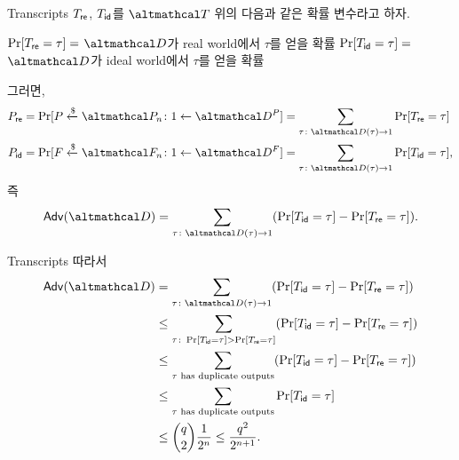 \documentclass[../250428_msquare_provable_security.tex]{subfiles}
\begin{document}
\begin{frame}{Transcripts}
    \(T_{\mathsf{re}}\), \(T_{\mathsf{id}}\)를 \(\mcal{T}\) 위의 다음과 같은 확률 변수라고 하자.
    \begin{itemize}
        \ii
        \(\Pr[T_{\mathsf{re}} = \tau] = \mbox{}\)\(\mcal{D}\)가 real world에서 \(\tau\)를 얻을 확률
        \ii
        \(\Pr[T_{\mathsf{id}} = \tau] = \mbox{}\)\(\mcal{D}\)가 ideal world에서 \(\tau\)를 얻을 확률
    \end{itemize}

    \pause
    그러면,
    \begin{align*}
        P_{\msf{re}} &= \Pr[P \dgets \mcal{P}_n \colon 1 \gets \mcal{D}^{P}]
        = \sum_{\tau \colon \mcal{D}(\tau) \to 1} \Pr[T_{\msf{re}} = \tau] \\
        P_{\msf{id}} &= \Pr[F \dgets \mcal{F}_n \colon 1 \gets \mcal{D}^{F}]
        = \sum_{\tau \colon \mcal{D}(\tau) \to 1} \Pr[T_{\msf{id}} = \tau]\text,
    \end{align*}
    \pause
    즉
    \[
        \msf{Adv}(\mcal{D})
        = \sum_{\tau \colon \mcal{D}(\tau) \to 1} (\Pr[T_{\msf{id}} = \tau] - \Pr[T_{\msf{re}} = \tau])\text.
    \]
\end{frame}

%

\begin{frame}{Transcripts}
    따라서
    \begin{align*}
        \msf{Adv}(\mcal{D})
        &= \sum_{\tau \colon \mcal{D}(\tau) \to 1} (\Pr[T_{\msf{id}} = \tau] - \Pr[T_{\msf{re}} = \tau]) \\
        &\le \sum_{\tau \colon \Pr[T_{\msf{id}} = \tau] > \Pr[T_{\msf{re}} = \tau]} (\Pr[T_{\msf{id}} = \tau] - \Pr[T_{\msf{re}} = \tau]) \\
        &\le \sum_{\tau\text{ has duplicate outputs}} (\Pr[T_{\msf{id}} = \tau] - \Pr[T_{\msf{re}} = \tau]) \\
        &\le \sum_{\tau\text{ has duplicate outputs}} \Pr[T_{\msf{id}} = \tau] \\
        &\le \binom{q}{2}\frac{1}{2^n} \le \frac{q^2}{2^{n+1}}\text.
    \end{align*}
\end{frame}
\end{document}
